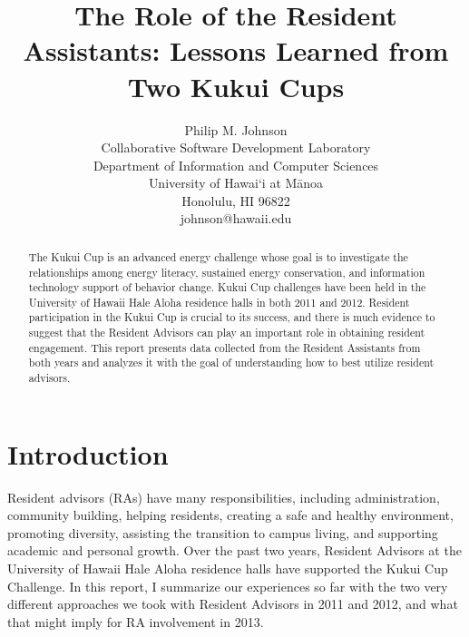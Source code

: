 \documentclass[]{IEEEconf}
\begin{document}
\onecolumn
\setlength{\parindent}{0cm}


\title{The Role of the Resident Assistants: Lessons Learned from Two Kukui Cups}

\author{Philip M. Johnson\\
        Collaborative Software Development Laboratory\\
        Department of Information and Computer Sciences\\
        University of Hawai`i at M\=anoa\\
        Honolulu, HI 96822\\
        johnson@hawaii.edu\\
}


\maketitle
\thispagestyle{empty}

\begin{abstract}  %
The Kukui Cup is an advanced energy challenge whose goal is to
investigate the relationships among energy literacy, sustained energy
conservation, and information technology support of behavior change. Kukui Cup
challenges have been held in the University of Hawaii Hale Aloha residence halls in both
2011 and 2012.  Resident participation in the Kukui Cup is crucial to its success, and
there is much evidence to suggest that the Resident Advisors can play an important role in
obtaining resident engagement. This report presents data collected from the Resident
Assistants from both years and analyzes it with the goal of understanding how to best
utilize resident advisors.
\end{abstract}

\setlength{\parskip}{3pt plus 1pt minus 1pt} 

\section{Introduction}

Resident advisors (RAs) have many responsibilities, including administration, community
building, helping residents, creating a safe and healthy environment, promoting diversity,
assisting the transition to campus living, and supporting academic and personal growth.
Over the past two years, Resident Advisors at the University of Hawaii Hale Aloha
residence halls have supported the Kukui Cup Challenge.  In this report, I summarize our
experiences so far with the two very different approaches we took with Resident Advisors in
2011 and 2012, and what that might imply for RA involvement in 2013.
\end{document}
